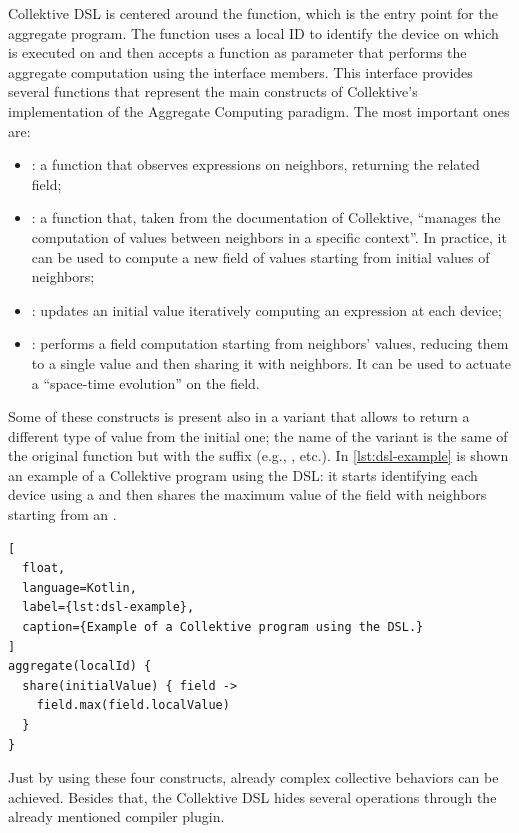 \documentclass[12pt,a4paper,openright,twoside]{book}
\begin{document}
Collektive DSL is centered around the  function, which is the
entry point for the aggregate program. The function uses a local ID to identify
the device on which is executed on and then accepts a function as parameter that
performs the aggregate computation using the  interface members.
%
This interface provides several functions that represent the main constructs of
Collektive's implementation of the Aggregate Computing paradigm. The most
important ones are:
\begin{itemize}
  \item {}: a function that observes expressions on
  neighbors, returning the related field;
  \item {}: a function that, taken from the documentation of
  Collektive, ``manages the computation of values between neighbors in a
  specific context''. In practice, it can be used to compute a new field of 
  values starting from initial values of neighbors;
  \item {}: updates an initial value iteratively computing an
  expression at each device;
  \item {}: performs a field computation starting from neighbors'
  values, reducing them to a single value and then sharing it with neighbors. 
  It can be used to actuate a ``space-time evolution'' on the field.
\end{itemize}

Some of these constructs is present also in a variant that allows to return a
different type of value from the initial one; the name of the variant is the
same of the original function but with the suffix  (e.g.,
,  etc.). In \cref{lst:dsl-example} is shown an
example of a Collektive program using the \ac{DSL}: it starts identifying each
device using a  and then shares the maximum value of the field
with neighbors starting from an .

\begin{lstlisting}[
  float, 
  language=Kotlin, 
  label={lst:dsl-example},
  caption={Example of a Collektive program using the DSL.}
]
aggregate(localId) {
  share(initialValue) { field ->
    field.max(field.localValue)
  }
}
\end{lstlisting}

Just by using these four constructs, already complex collective behaviors can
be achieved. Besides that, the Collektive \ac{DSL} hides several operations through
the already mentioned compiler plugin. 
\end{document}
